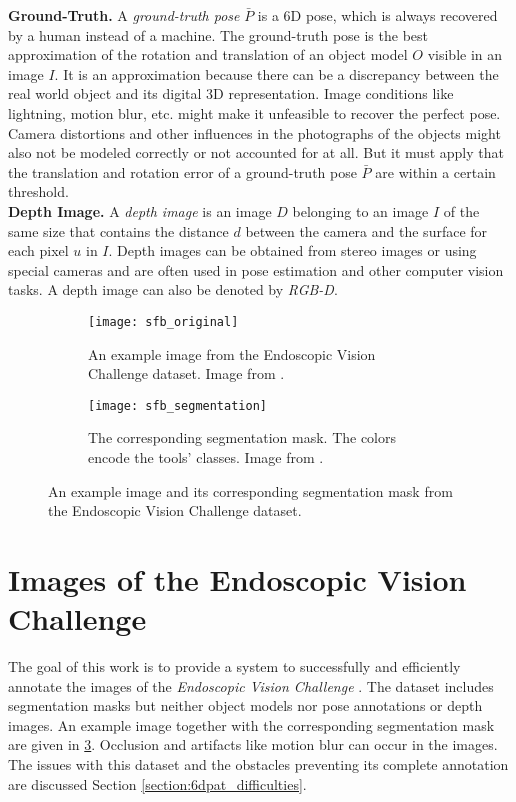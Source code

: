 \noindent\textbf{Ground-Truth.} A \textit{ground-truth pose} $\bar{P}$ is a 6D pose, which is always recovered by a human instead of a machine. The ground-truth pose is the best approximation of the rotation and translation of an object model $O$ visible in an image $I$. It is an approximation because there can be a discrepancy between the real world object and its digital 3D representation. Image conditions like lightning, motion blur, etc. might make it unfeasible to recover the perfect pose. Camera distortions and other influences in the photographs of the objects might also not be modeled correctly or not accounted for at all. But it must apply that the translation and rotation error of a ground-truth pose $\bar{P}$ are within a certain threshold. \\

\noindent\textbf{Depth Image.} A \textit{depth image} is an image $D$ belonging to an image $I$ of the same size that contains the distance $d$ between the camera and the surface for each pixel $u$ in $I$. Depth images can be obtained from stereo images or using special cameras and are often used in pose estimation and other computer vision tasks. A depth image can also be denoted by \textit{RGB-D}.

\begin{figure}[!tbp]
	\centering
	\begin{subfigure}[t]{0.47\textwidth}
	\centering
    	\texttt{[image: sfb\_original]}
    	\caption{An example image from the Endoscopic Vision Challenge dataset. Image from \cite{endovis}.}
    	\label{fig:sfb_original}
	\end{subfigure}
	\hfill
	\begin{subfigure}[t]{0.47\textwidth}
	\centering
    	\texttt{[image: sfb\_segmentation]}
    	\caption{The corresponding segmentation mask. The colors encode the tools' classes. Image from \cite{endovis}.}
    	\label{fig:sfb_segmentation}
	\end{subfigure}
	\caption{An example image and its corresponding segmentation mask from the Endoscopic Vision Challenge dataset.}
	\label{fig:sfb}
\end{figure} 

\section{Images of the Endoscopic Vision Challenge}

The goal of this work is to provide a system to successfully and efficiently annotate the images of the \textit{Endoscopic Vision Challenge} \cite{endovis}. The dataset includes segmentation masks but neither object models nor pose annotations or depth images. An example image together with the corresponding segmentation mask are given in \fig \ref{fig:sfb}. Occlusion and artifacts like motion blur can occur in the images. The issues with this dataset and the obstacles preventing its complete annotation are discussed Section \ref{section:6dpat_difficulties}. 

